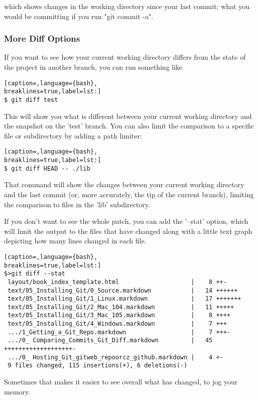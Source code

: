 which shows changes in the working directory since your last commit; what you
would be committing if you run "git commit -a".

\subsubsection{More Diff Options}
If you want to see how your current working directory differs from the state of
the project in another branch, you can run something like
\lstset{basicstyle=\scriptsize, numbers=none, captionpos=b, tabsize=4}
\begin{lstlisting}[caption=,language={bash},
breaklines=true,label=lst:]
$ git diff test
\end{lstlisting}

This will show you what is different between your current working directory and
the snapshot on the 'test' branch. You can also limit the comparison to a
specific file or subdirectory by adding a path limiter:
\lstset{basicstyle=\scriptsize, numbers=none, captionpos=b, tabsize=4}
\begin{lstlisting}[caption=,language={bash},
breaklines=true,label=lst:]
$ git diff HEAD -- ./lib 
\end{lstlisting}

That command will show the changes between your current working directory and
the last commit (or, more accurately, the tip of the current branch), limiting
the comparison to files in the 'lib' subdirectory.

If you don't want to see the whole patch, you can add the '--stat' option,
which will limit the output to the files that have changed along with a little
text graph depicting how many lines changed in each file.
\lstset{basicstyle=\scriptsize, numbers=none, captionpos=b, tabsize=4}
\begin{lstlisting}[caption=,language={bash},
breaklines=true,label=lst:]
$>git diff --stat
 layout/book_index_template.html                    |    8 ++-
 text/05_Installing_Git/0_Source.markdown           |   14 ++++++
 text/05_Installing_Git/1_Linux.markdown            |   17 +++++++
 text/05_Installing_Git/2_Mac_104.markdown          |   11 +++++
 text/05_Installing_Git/3_Mac_105.markdown          |    8 ++++
 text/05_Installing_Git/4_Windows.markdown          |    7 +++
 .../1_Getting_a_Git_Repo.markdown                  |    7 +++-
 .../0_ Comparing_Commits_Git_Diff.markdown         |   45 +++++++++++++++++++-
 .../0_ Hosting_Git_gitweb_repoorcz_github.markdown |    4 +-
 9 files changed, 115 insertions(+), 6 deletions(-)
\end{lstlisting}

Sometimes that makes it easier to see overall what has changed, to jog your
memory.
